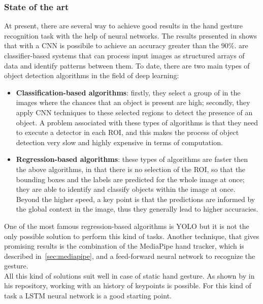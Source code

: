 \documentclass[../thesis.tex]{subfiles}
\begin{document}
\subsubsection{State of the art}
At present, there are several way to achieve good results in the hand gesture recognition task with the help of neural networks. The results presented in \citeauthor{article:survey_on_vision_based_hand_gesture_recognition}\cite{article:survey_on_vision_based_hand_gesture_recognition} shows that with a \acrfull{CNN} is possibile to achieve an accuracy greater than the $90\%$.  are classifier-based systems that can process input images as structured arrays of data and identify patterns between them. To date, there are two main types of object detection algorithms in the field of deep learning:
\begin{itemize}
    \item \textbf{Classification-based algorithms}: firstly, they select a group of  in the images where the chances that an object is present are high; secondly, they apply \acrshort{CNN} techniques to these selected regions to detect the presence of an object. A problem associated with these types of algorithms is that they need to execute a detector in each \acrshort{ROI}, and this makes the process of object detection very slow and highly expensive in terms of computation.
    \item \textbf{Regression-based algorithms}: these types of algorithms are faster then the above algorithms, in that there is no selection of the \acrshort{ROI}, so that the bounding boxes and the labels are predicted for the whole image at once; they are able to identify and classify objects within the image at once. Beyond the higher speed, a key point is that the predictions are informed by the global context in the image, thus they generally lead to higher accuracies.
\end{itemize}
One of the most famous regression-based algorithms is \gls{YOLO} but it is not the only possible solution to perform this kind of tasks. Another technique, that gives promising results is the combination of the MediaPipe hand tracker, which is described in~\ref{sec:mediapipe}, and a feed-forward neural network to recognize the gesture.\\
All this kind of solutions suit well in case of static hand gesture. As shown by \citeauthor{site:hand_gesture_base_repo} in his repository\cite{site:hand_gesture_base_repo}, working with an history of keypoints is possible. For this kind of task a \gls{LSTM} neural network is a good starting point.
\end{document}
